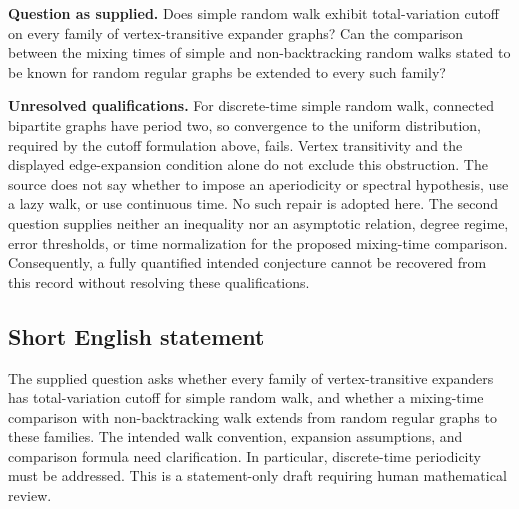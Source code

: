 \documentclass[11pt]{article}
\begin{document}
\textbf{Question as supplied.} Does simple random walk exhibit total-variation cutoff on every family of vertex-transitive expander graphs? Can the comparison between the mixing times of simple and non-backtracking random walks stated to be known for random regular graphs be extended to every such family?

\textbf{Unresolved qualifications.} For discrete-time simple random walk, connected bipartite graphs have period two, so convergence to the uniform distribution, required by the cutoff formulation above, fails. Vertex transitivity and the displayed edge-expansion condition alone do not exclude this obstruction. The source does not say whether to impose an aperiodicity or spectral hypothesis, use a lazy walk, or use continuous time. No such repair is adopted here. The second question supplies neither an inequality nor an asymptotic relation, degree regime, error thresholds, or time normalization for the proposed mixing-time comparison. Consequently, a fully quantified intended conjecture cannot be recovered from this record without resolving these qualifications.
\subsection{Short English statement}
The supplied question asks whether every family of vertex-transitive expanders has total-variation cutoff for simple random walk, and whether a mixing-time comparison with non-backtracking walk extends from random regular graphs to these families. The intended walk convention, expansion assumptions, and comparison formula need clarification. In particular, discrete-time periodicity must be addressed. This is a statement-only draft requiring human mathematical review.
\end{document}
